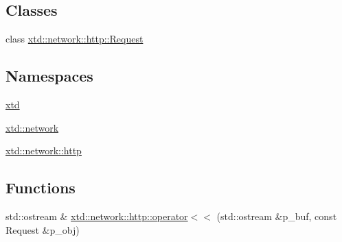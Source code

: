 \subsection*{Classes}
\begin{DoxyCompactItemize}
\item 
class \hyperlink{classxtd_1_1network_1_1http_1_1Request}{xtd\-::network\-::http\-::\-Request}
\end{DoxyCompactItemize}
\subsection*{Namespaces}
\begin{DoxyCompactItemize}
\item 
\hyperlink{namespacextd}{xtd}
\item 
\hyperlink{namespacextd_1_1network}{xtd\-::network}
\item 
\hyperlink{namespacextd_1_1network_1_1http}{xtd\-::network\-::http}
\end{DoxyCompactItemize}
\subsection*{Functions}
\begin{DoxyCompactItemize}
\item 
std\-::ostream \& \hyperlink{namespacextd_1_1network_1_1http_a48e500be5ba75ae2ce3d8bdb549f9211}{xtd\-::network\-::http\-::operator$<$$<$} (std\-::ostream \&p\-\_\-buf, const Request \&p\-\_\-obj)
\end{DoxyCompactItemize}

